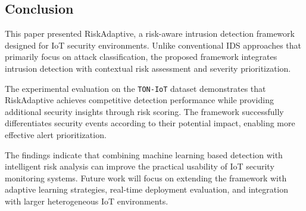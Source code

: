 \subsection{Conclusion}

This paper presented RiskAdaptive, a risk-aware intrusion detection
framework designed for IoT security environments. Unlike conventional
IDS approaches that primarily focus on attack classification, the
proposed framework integrates intrusion detection with contextual risk
assessment and severity prioritization.

The experimental evaluation on the \texttt{TON-IoT} dataset demonstrates that
RiskAdaptive achieves competitive detection performance while providing
additional security insights through risk scoring. The framework
successfully differentiates security events according to their
potential impact, enabling more effective alert prioritization.

The findings indicate that combining machine learning based detection
with intelligent risk analysis can improve the practical usability of
IoT security monitoring systems. Future work will focus on extending
the framework with adaptive learning strategies, real-time deployment
evaluation, and integration with larger heterogeneous IoT environments.
